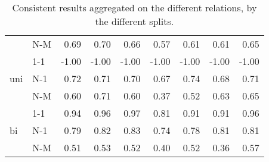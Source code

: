 \begin{table*}[t]
{\begin{tabular}{llrrrrrrr}
   & N-M &             0.69 &              0.70 &                                 0.66 &          0.57 &           0.61 &            0.61 &               0.65 \\
\cline{1-9}
\multirow{3}{*}{uni} & 1-1 &            -1.00 &             -1.00 &                                -1.00 &         -1.00 &          -1.00 &           -1.00 &              -1.00 \\
   & N-1 &             0.72 &              0.71 &                                 0.70 &          0.67 &           0.74 &            0.68 &               0.71 \\
   & N-M &             0.60 &              0.71 &                                 0.60 &          0.37 &           0.52 &            0.63 &               0.65 \\
\cline{1-9}
\multirow{3}{*}{bi} & 1-1 &             0.94 &              0.96 &                                 0.97 &          0.81 &           0.91 &            0.91 &               0.96 \\
   & N-1 &             0.79 &              0.82 &                                 0.83 &          0.74 &           0.78 &            0.81 &               0.81 \\
   & N-M &             0.51 &              0.53 &                                 0.52 &          0.40 &           0.52 &            0.36 &               0.57 \\
\bottomrule
\end{tabular}

}
    \caption{Consistent results aggregated on the different relations, by the different splits.}
    \label{tab:entailment-splits}
\end{table*}